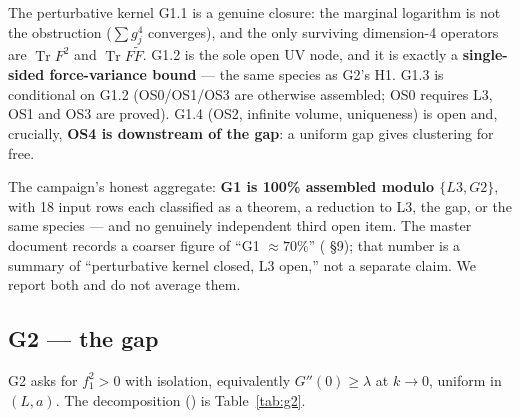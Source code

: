 The perturbative kernel G1.1 is a genuine closure: the marginal logarithm is not the obstruction
($\sum g_j^4$ converges), and the only surviving dimension-4 operators are
$\operatorname{Tr}F^2$ and $\operatorname{Tr}F\tilde F$. G1.2 is the sole open UV node, and it
is exactly a \textbf{single-sided force-variance bound} --- the same species as G2's H1. G1.3 is
conditional on G1.2 (OS0/OS1/OS3 are otherwise assembled; OS0 requires L3, OS1 and OS3 are
proved). G1.4 (OS2, infinite volume, uniqueness) is open and, crucially, \textbf{OS4 is
downstream of the gap}: a uniform gap gives clustering for free.

The campaign's honest aggregate: \textbf{G1 is 100\% assembled modulo $\{L3,G2\}$}, with 18
input rows each classified as a theorem, a reduction to L3, the gap, or the same species --- and
no genuinely independent third open item. The master document records a coarser figure of
``G1 $\approx70\%$'' ( \S9); that number is a summary of
``perturbative kernel closed, L3 open,'' not a separate claim. We report both and do not average
them.

\subsection{G2 --- the gap}

G2 asks for $f_1^2>0$ with isolation, equivalently $G''(0)\ge\lambda$ at $k\to0$, uniform in
$(L,a)$. The decomposition () is
Table~\ref{tab:g2}.

